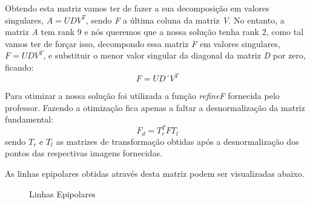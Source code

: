 \documentclass[journal]{IEEEtran}
\begin{document}
\par Obtendo esta matriz vamos ter de fazer a sua decomposição em valores singulares, $A = UDV^T$, sendo \textit{F} a última coluna da matriz \textit{V}. No entanto, a matriz \textit{A} tem rank 9 e nós queremos que a nossa solução tenha rank 2, como tal vamos ter de forçar isso, decompondo essa matriz \textit{F} em valores singulares, $F = UDV^T$, e substituir o menor valor singular da diagonal da matriz \textit{D} por zero, ficando:
\begin{equation}
    F = UD´V^T
\end{equation}
\par Para otimizar a nossa solução foi utilizada a função \textit{refineF} fornecida pelo professor. Fazendo a otimização fica apenas a faltar a desnormalização da matriz fundamental:
\begin{equation}
    F_d = T_r^TFT_l
\end{equation}
sendo $T_r$ e $T_l$ as matrizes de transformação obtidas após a desnormalização dos pontos das respectivas imagens fornecidas.
\par As linhas epipolares obtidas através desta matriz podem ser visualizadas abaixo.
\begin{figure}[H]
        \centering
        \qquad
        \caption{Linhas Epipolares}
        \label{fig:6}
\end{figure}
\end{document}
